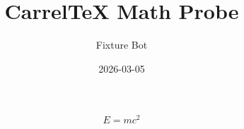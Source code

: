 \documentclass{article}
\title{CarrelTeX Math Probe}
\author{Fixture Bot}
\date{2026-03-05}
\begin{document}
\maketitle

\[
  E = mc^2
\]
\end{document}
